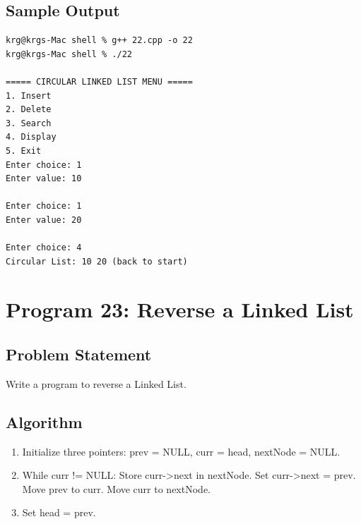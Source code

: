 \documentclass[a4paper,12pt]{article}
\begin{document}
\subsection*{Sample Output}
\begin{lstlisting}[style=outputstyle]
krg@krgs-Mac shell % g++ 22.cpp -o 22
krg@krgs-Mac shell % ./22

===== CIRCULAR LINKED LIST MENU =====
1. Insert
2. Delete
3. Search
4. Display
5. Exit
Enter choice: 1
Enter value: 10

Enter choice: 1
Enter value: 20

Enter choice: 4
Circular List: 10 20 (back to start)
\end{lstlisting}

\newpage

\section*{Program 23: Reverse a Linked List}

\subsection*{Problem Statement}
Write a program to reverse a Linked List.

\subsection*{Algorithm}
\begin{enumerate}
    \item Initialize three pointers: prev = NULL, curr = head, nextNode = NULL.
    \item While curr != NULL: Store curr->next in nextNode. Set curr->next = prev. Move prev to curr. Move curr to nextNode.
    \item Set head = prev.
\end{enumerate}
\end{document}
